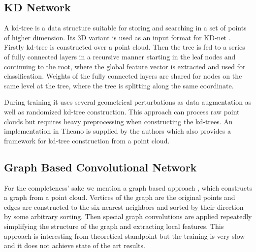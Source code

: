 \subsection{KD Network}
A kd-tree \cite{bentley_multidimensional_1975} is a data structure suitable for storing and searching in a set of points of higher dimension. Its 3D variant is used as an input format for KD-net \cite{klokov_escape_2017}. Firstly kd-tree is constructed over a point cloud. Then the tree is fed to a series of fully connected layers in a recursive manner starting in the leaf nodes and continuing to the root, where the global feature vector is extracted and used for classification. Weights of the fully connected layers are shared for nodes on the same level at the tree, where the tree is splitting along the same coordinate. \par
During training it uses several geometrical perturbations as data augmentation as well as randomized kd-tree construction. This approach can process raw point clouds but requires heavy preprocessing when constructing the kd-trees.
An implementation in Theano is supplied by the authors which also provides a framework for kd-tree construction from a point cloud.

\subsection{Graph Based Convolutional Network}
For the completeness’ sake we mention a graph based approach \cite{dominguez_general-purpose_2018}, which constructs a graph from a point cloud. Vertices of the graph are the original points and edges are constructed to the six nearest neighbors and sorted by their direction by some arbitrary sorting. Then special graph convolutions are applied repeatedly simplifying the structure of the graph and extracting local features. This approach is interesting from theoretical standpoint but the training is very slow and it does not achieve state of the art results.